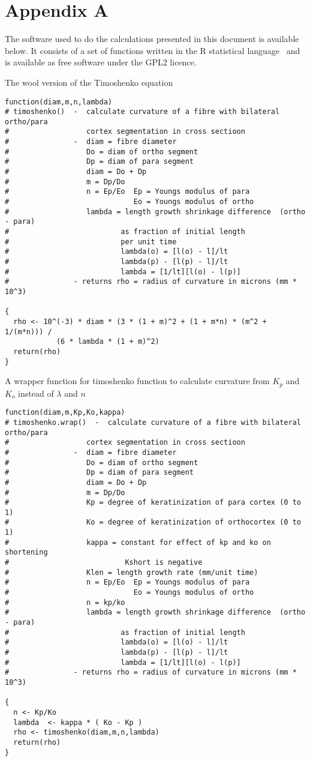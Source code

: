 \documentclass[titlepage]{article}  %
\begin{document}
\appendix
\section{Appendix A}
The software used to do the calculations presented in this document is available below. It consists of a set of functions written in the R statistical language~\cite{rprog:13} and is available as free software under the GPL2 licence.

The wool version of the Timoshenko equation
\begin{verbatim}
function(diam,m,n,lambda)
# timoshenko()  -  calculate curvature of a fibre with bilateral ortho/para
#                  cortex segmentation in cross sectioon
#               -  diam = fibre diameter
#                  Do = diam of ortho segment
#                  Dp = diam of para segment
#                  diam = Do + Dp
#                  m = Dp/Do
#                  n = Ep/Eo  Ep = Youngs modulus of para
#                             Eo = Youngs modulus of ortho
#                  lambda = length growth shrinkage difference  (ortho - para)
#                          as fraction of initial length
#                          per unit time
#                          lambda(o) = [l(o) - l]/lt
#                          lambda(p) - [l(p) - l]/lt
#                          lambda = [1/lt][l(o) - l(p)]
#               - returns rho = radius of curvature in microns (mm * 10^3)

{
  rho <- 10^(-3) * diam * (3 * (1 + m)^2 + (1 + m*n) * (m^2 + 1/(m*n))) /
            (6 * lambda * (1 + m)^2)
  return(rho)
}
\end{verbatim}

A wrapper function for timoshenko  function to calculate curvature from $K_{p}$ and $K_{o}$ instead of $\lambda$ and $n$
\begin{verbatim}
function(diam,m,Kp,Ko,kappa)
# timoshenko.wrap()  -  calculate curvature of a fibre with bilateral ortho/para
#                  cortex segmentation in cross sectioon
#               -  diam = fibre diameter
#                  Do = diam of ortho segment
#                  Dp = diam of para segment
#                  diam = Do + Dp
#                  m = Dp/Do
#                  Kp = degree of keratinization of para cortex (0 to 1)
#                  Ko = degree of keratinization of orthocortex (0 to 1)
#                  kappa = constant for effect of kp and ko on shortening
#                           Kshort is negative
#                  Klen = length growth rate (mm/unit time)
#                  n = Ep/Eo  Ep = Youngs modulus of para
#                             Eo = Youngs modulus of ortho
#                  n = kp/ko
#                  lambda = length growth shrinkage difference  (ortho - para)
#                          as fraction of initial length
#                          lambda(o) = [l(o) - l]/lt
#                          lambda(p) - [l(p) - l]/lt
#                          lambda = [1/lt][l(o) - l(p)]
#               - returns rho = radius of curvature in microns (mm * 10^3)

{
  n <- Kp/Ko
  lambda  <- kappa * ( Ko - Kp )
  rho <- timoshenko(diam,m,n,lambda)
  return(rho)
}
\end{verbatim}
\end{document}
